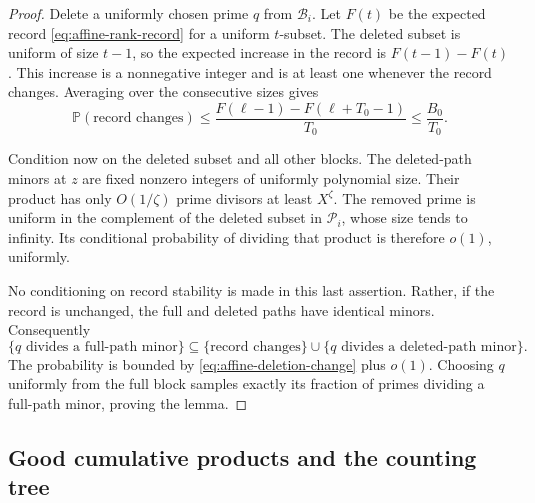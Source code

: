 \begin{proof}
Delete a uniformly chosen prime $q$ from $\mathcal B_i$.  Let $F(t)$
be the expected record \eqref{eq:affine-rank-record} for a uniform
$t$-subset.  The deleted subset is uniform of size $t-1$, so the
expected increase in the record is $F(t-1)-F(t)$.  This increase is
a nonnegative integer and is at least one whenever the record
changes.  Averaging over the consecutive sizes gives
\begin{equation}\label{eq:affine-deletion-change}
 \mathbb P(\text{record changes})
 \le\frac{F(\ell-1)-F(\ell+T_0-1)}{T_0}
 \le\frac{B_0}{T_0}.
\end{equation}

Condition now on the deleted subset and all other blocks.  The
deleted-path minors at $z$ are fixed nonzero integers of uniformly
polynomial size.  Their product has only $O(1/\zeta)$ prime divisors
at least $X^\zeta$.  The removed prime is uniform in the complement
of the deleted subset in $\mathcal P_i$, whose size tends to infinity.
Its conditional probability of dividing that product is therefore
$o(1)$, uniformly.

No conditioning on record stability is made in this last assertion.
Rather, if the record is unchanged, the full and deleted paths have
identical minors.  Consequently
\[
 \{q\text{ divides a full-path minor}\}
 \subseteq
 \{\text{record changes}\}
 \cup\{q\text{ divides a deleted-path minor}\}.
\]
The probability is bounded by \eqref{eq:affine-deletion-change} plus
$o(1)$.  Choosing $q$ uniformly from the full block samples exactly
its fraction of primes dividing a full-path minor, proving the lemma.
\end{proof}

\subsection{Good cumulative products and the counting tree}

